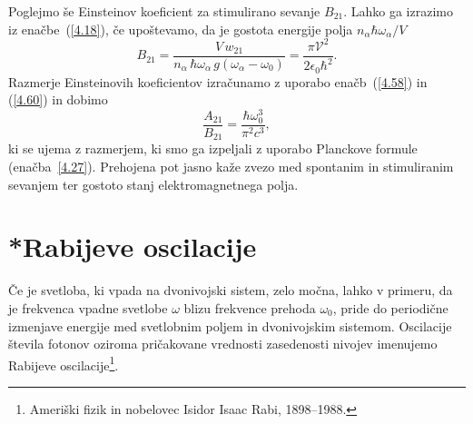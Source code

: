 Poglejmo še Einsteinov koeficient za stimulirano sevanje $B_{21}$. Lahko ga 
izrazimo iz enačbe~(\ref{4.18}), če upoštevamo, da je gostota energije 
polja $n_{\alpha}\hbar\omega_{\alpha}/V$
\begin{equation}
B_{21}=\frac{V\,w_{21}}{n_{\alpha}\,\hbar\omega_{\alpha}\, g(\omega_{\alpha}-\omega_0)}
=\frac{\pi \mathcal{V}^{2}}{2\epsilon_{0}\hbar^{2}}.
\label{4.60}
\end{equation}
Razmerje Einsteinovih koeficientov izračunamo z uporabo enačb~(\ref{4.58}) in 
(\ref{4.60}) in dobimo
\begin{equation}
 \frac{A_{21}}{B_{21}}=\frac{\hbar \omega_0^3}{\pi^2 c^3},
\end{equation}
ki se ujema z razmerjem, ki smo ga izpeljali z uporabo
Planckove formule (enačba~\ref{4.27}). Prehojena pot jasno kaže zvezo med spontanim in
stimuliranim sevanjem ter gostoto stanj elektromagnetnega polja. 

\section{*Rabijeve oscilacije}
Če je svetloba, ki vpada na dvonivojski sistem, zelo močna, lahko v primeru, da je frekvenca 
vpadne svetlobe $\omega$ blizu frekvence prehoda $\omega_0$, pride do periodične 
izmenjave energije med 
svetlobnim poljem in dvonivojskim sistemom. 
Oscilacije števila fotonov oziroma pričakovane 
vrednosti zasedenosti nivojev imenujemo Rabijeve 
oscilacije\footnote{Ameriški fizik in nobelovec Isidor Isaac Rabi, 1898--1988.}. 

